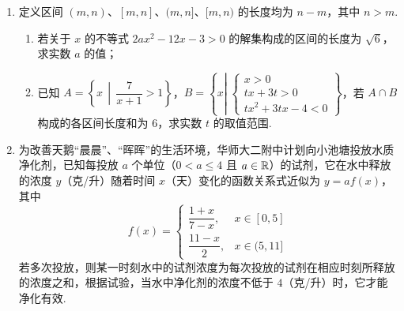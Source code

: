 \documentclass[a4paper,11pt]{article}
\begin{document}
\begin{enumerate}
\fi

\ansspace[5]

\item 定义区间 $(m,n)$、$[m,n]$、$(m,n]$、$[m,n)$ 的长度均为 $n-m$，其中 $n>m$.

\begin{enumerate}[label=(\arabic*)]
\item 若关于 $x$ 的不等式 $2ax^2-12x-3>0$ 的解集构成的区间的长度为 $\sqrt6$，求实数 $a$ 的值；
\item 已知 $A=\left\{x\,\middle|\,\dfrac7{x+1}>1\right\}$，$B=\left\{x\left|\;\begin{cases}x>0\\tx+3t>0\\tx^2+3tx-4<0\end{cases}\right.\right\}$，若 $A\cap B$ 构成的各区间长度和为 $6$，求实数 $t$ 的取值范围.
\end{enumerate}

\ifanswer
\solbegin
{}
\step{综上所述，$t$ 的取值范围为 $\left(0,\dfrac2{27}\right]$.}
\solend

\fi

\ansspace[7]

\item 为改善天鹅“晨晨”、“晖晖”的生活环境，华师大二附中计划向小池塘投放水质净化剂，已知每投放 $a$ 个单位（$0<a\leqslant4$ 且 $a\in\mathbb{R}$）的试剂，它在水中释放的浓度 $y$（克/升）随着时间 $x$（天）变化的函数关系式近似为 $y=af(x)$，其中
\[
f(x)=
\begin{cases}
\dfrac{1+x}{7-x}, & x\in[0,5]\\[2pt]
\dfrac{11-x}{2}, & x\in(5,11]
\end{cases}
\]
若多次投放，则某一时刻水中的试剂浓度为每次投放的试剂在相应时刻所释放的浓度之和，根据试验，当水中净化剂的浓度不低于 $4$（克/升）时，它才能净化有效.


\end{enumerate}
\end{document}
